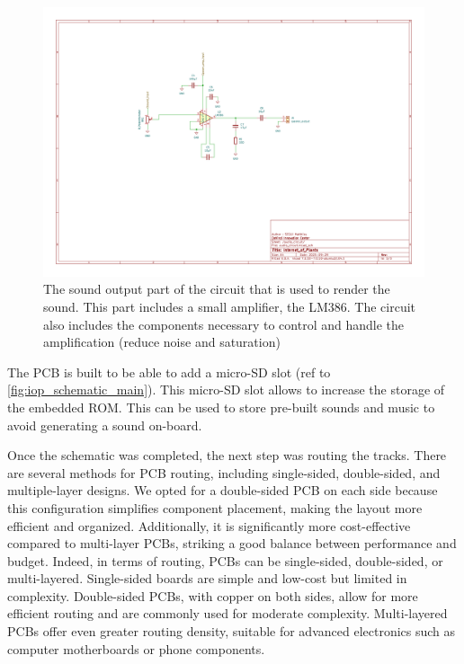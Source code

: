 \begin{figure}[H]
    \centering
    \includegraphics[width=\textwidth]{images/iop-audio_circuit.pdf}
    \caption{The sound output part of the circuit that is used to render the sound.
        This part includes a small amplifier, the LM386. The circuit also includes the components necessary
        to control and handle the amplification (reduce noise and saturation)}
    \vspace{0.1cm}
    \label{fig:iop_schematic_audio}
\end{figure}

The PCB is built to be able to add a micro-SD slot (ref to \ref{fig:iop_schematic_main}). This micro-SD slot
allows to increase the storage of the embedded ROM. This can be used to store pre-built sounds and music to avoid generating a sound on-board.


Once the schematic was completed, the next step was routing the tracks. There are several methods for PCB routing, including single-sided, double-sided, and multiple-layer designs. We opted for a double-sided PCB on each side because this configuration simplifies component placement, making the layout more efficient and organized. Additionally, it is significantly more cost-effective compared to multi-layer PCBs, striking a good balance between performance and budget. Indeed, in terms of routing, PCBs can be single-sided, double-sided, or multi-layered. Single-sided boards are simple and low-cost but limited in complexity. Double-sided PCBs, with copper on both sides, allow for more efficient routing and are commonly used for moderate complexity. Multi-layered PCBs offer even greater routing density, suitable for advanced electronics such as computer motherboards or phone components.

